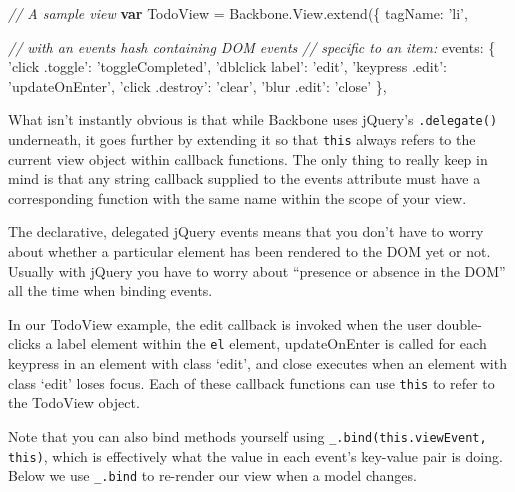 \documentclass[9pt]{book}
\newenvironment{Shaded}{}{}
\newcommand{\KeywordTok}[1]{\textcolor[rgb]{0.00,0.44,0.13}{\textbf{{#1}}}}
\newcommand{\DataTypeTok}[1]{\textcolor[rgb]{0.56,0.13,0.00}{{#1}}}
\newcommand{\StringTok}[1]{\textcolor[rgb]{0.25,0.44,0.63}{{#1}}}
\newcommand{\CommentTok}[1]{\textcolor[rgb]{0.38,0.63,0.69}{\textit{{#1}}}}
\newcommand{\OtherTok}[1]{\textcolor[rgb]{0.00,0.44,0.13}{{#1}}}
\newcommand{\FunctionTok}[1]{\textcolor[rgb]{0.02,0.16,0.49}{{#1}}}
\newcommand{\NormalTok}[1]{{#1}}
\begin{document}
\begin{Shaded}
\begin{Highlighting}[]

\CommentTok{// A sample view}
\KeywordTok{var} \NormalTok{TodoView = }\OtherTok{Backbone}\NormalTok{.}\OtherTok{View}\NormalTok{.}\FunctionTok{extend}\NormalTok{(\{}
  \DataTypeTok{tagName}\NormalTok{:  }\StringTok{'li'}\NormalTok{,}

  \CommentTok{// with an events hash containing DOM events}
  \CommentTok{// specific to an item:}
  \DataTypeTok{events}\NormalTok{: \{}
    \StringTok{'click .toggle'}\NormalTok{: }\StringTok{'toggleCompleted'}\NormalTok{,}
    \StringTok{'dblclick label'}\NormalTok{: }\StringTok{'edit'}\NormalTok{,}
    \StringTok{'keypress .edit'}\NormalTok{: }\StringTok{'updateOnEnter'}\NormalTok{,}
    \StringTok{'click .destroy'}\NormalTok{: }\StringTok{'clear'}\NormalTok{,}
    \StringTok{'blur .edit'}\NormalTok{: }\StringTok{'close'}
  \NormalTok{\},}
\end{Highlighting}
\end{Shaded}

What isn't instantly obvious is that while Backbone uses jQuery's
\texttt{.delegate()} underneath, it goes further by extending it so that
\texttt{this} always refers to the current view object within callback
functions. The only thing to really keep in mind is that any string
callback supplied to the events attribute must have a corresponding
function with the same name within the scope of your view.

The declarative, delegated jQuery events means that you don't have to
worry about whether a particular element has been rendered to the DOM
yet or not. Usually with jQuery you have to worry about ``presence or
absence in the DOM'' all the time when binding events.

In our TodoView example, the edit callback is invoked when the user
double-clicks a label element within the \texttt{el} element,
updateOnEnter is called for each keypress in an element with class
`edit', and close executes when an element with class `edit' loses
focus. Each of these callback functions can use \texttt{this} to refer
to the TodoView object.

Note that you can also bind methods yourself using
\texttt{\_.bind(this.viewEvent, this)}, which is effectively what the
value in each event's key-value pair is doing. Below we use
\texttt{\_.bind} to re-render our view when a model changes.
\end{document}
